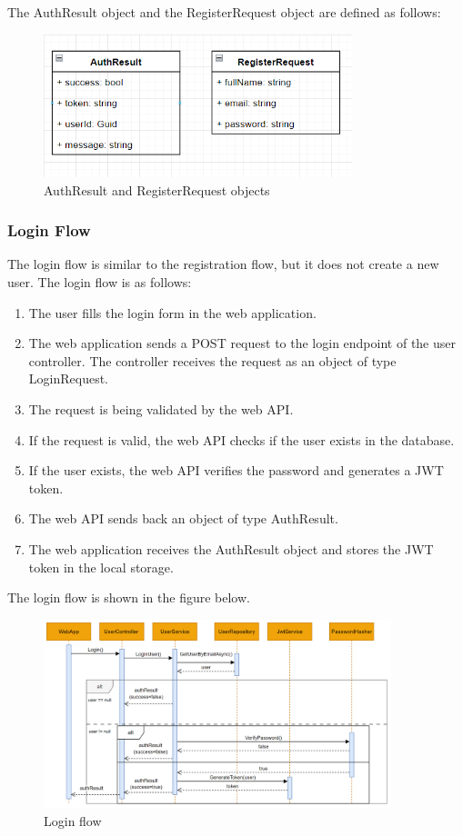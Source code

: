 The AuthResult object and the RegisterRequest object are defined as follows:
\begin{figure}[H]
    \centering
    \includegraphics[width=0.8\textwidth]{images/auth-request.png}
    \caption{AuthResult and RegisterRequest objects}
    \label{fig:auth-result}
\end{figure}

\subsubsection{Login Flow}
The login flow is similar to the registration flow, but it does not create a new user.
The login flow is as follows:
\begin{enumerate}
    \item The user fills the login form in the web application.
    \item The web application sends a POST request to the login endpoint of the user controller. The controller
    receives the request as an object of type LoginRequest.
    \item The request is being validated by the web API.
    \item If the request is valid, the web API checks if the user exists in the database.
    \item If the user exists, the web API verifies the password and generates a JWT token.
    \item The web API sends back an object of type AuthResult.
    \item The web application receives the AuthResult object and stores the JWT token in the local storage.
\end{enumerate}

The login flow is shown in the figure below.
\begin{figure}[H]
    \centering
    \includegraphics[width=0.9\textwidth]{images/login-flow.png}
    \caption{Login flow}
    \label{fig:login-flow}
\end{figure}